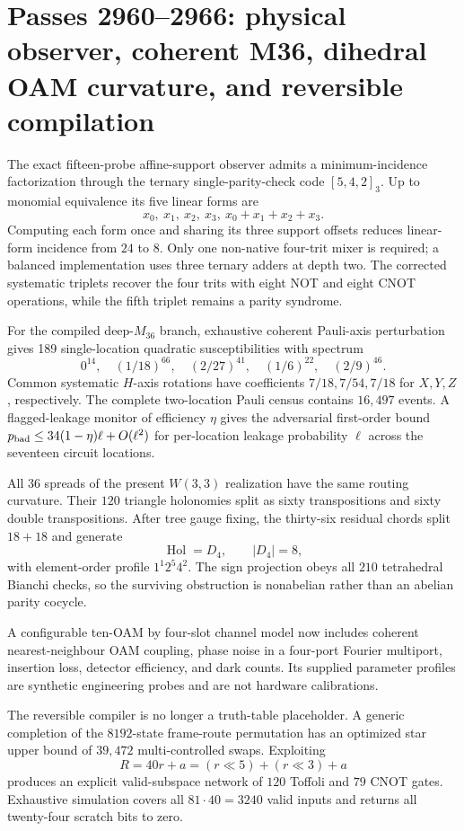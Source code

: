 \section{Passes 2960--2966: physical observer, coherent M36, dihedral OAM curvature, and reversible compilation}
\label{sec:bt2960-bt2966}

The exact fifteen-probe affine-support observer admits a minimum-incidence factorization through the ternary single-parity-check code $[5,4,2]_3$.  Up to monomial equivalence its five linear forms are
\[
 x_0,\ x_1,\ x_2,\ x_3,\ x_0+x_1+x_2+x_3.
\]
Computing each form once and sharing its three support offsets reduces linear-form incidence from $24$ to $8$.  Only one non-native four-trit mixer is required; a balanced implementation uses three ternary adders at depth two.  The corrected systematic triplets recover the four trits with eight NOT and eight CNOT operations, while the fifth triplet remains a parity syndrome.

For the compiled deep-$M_{36}$ branch, exhaustive coherent Pauli-axis perturbation gives 189 single-location quadratic susceptibilities with spectrum
\[
 0^{14},\quad (1/18)^{66},\quad (2/27)^{41},\quad (1/6)^{22},\quad (2/9)^{46}.
\]
Common systematic $H$-axis rotations have coefficients $7/18,7/54,7/18$ for $X,Y,Z$, respectively.  The complete two-location Pauli census contains $16{,}497$ events.  A flagged-leakage monitor of efficiency $\eta$ gives the adversarial first-order bound $p_{\rm bad}\le34(1-\eta)\ell+O(\ell^2)$ for per-location leakage probability $\ell$ across the seventeen circuit locations.

All $36$ spreads of the present $W(3,3)$ realization have the same routing curvature.  Their $120$ triangle holonomies split as sixty transpositions and sixty double transpositions.  After tree gauge fixing, the thirty-six residual chords split $18+18$ and generate
\[
 \operatorname{Hol}=D_4,
 \qquad |D_4|=8,
\]
with element-order profile $1^1 2^5 4^2$.  The sign projection obeys all $210$ tetrahedral Bianchi checks, so the surviving obstruction is nonabelian rather than an abelian parity cocycle.

A configurable ten-OAM by four-slot channel model now includes coherent nearest-neighbour OAM coupling, phase noise in a four-port Fourier multiport, insertion loss, detector efficiency, and dark counts.  Its supplied parameter profiles are synthetic engineering probes and are not hardware calibrations.

The reversible compiler is no longer a truth-table placeholder.  A generic completion of the $8192$-state frame-route permutation has an optimized star upper bound of $39{,}472$ multi-controlled swaps.  Exploiting
\[
 R=40r+a=(r\ll5)+(r\ll3)+a
\]
produces an explicit valid-subspace network of $120$ Toffoli and $79$ CNOT gates.  Exhaustive simulation covers all $81\cdot40=3240$ valid inputs and returns all twenty-four scratch bits to zero.

